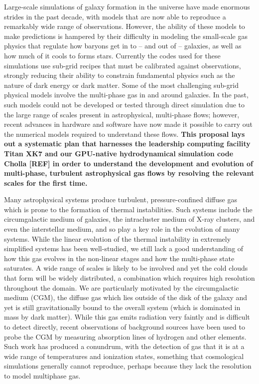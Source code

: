 \documentclass[11pt,letterpaper,english]{article}
\begin{document}
Large-scale simulations of galaxy formation in the universe have made enormous strides in the past decade, with models that are now able to reproduce a remarkably wide range of observations.  However, the ability of these models to make predictions is hampered by their difficulty in modeling the small-scale gas physics that regulate how baryons get in to -- and out of -- galaxies, as well as how much of it cools to forms stars.   Currently the codes used for these simulations use sub-grid recipes that must be calibrated against observations, strongly reducing their ability to constrain fundamental physics such as the nature of dark energy or dark matter.  Some of the most challenging sub-grid physical models involve the multi-phase gas in and around galaxies.   In the past, such models could not be developed or tested through direct simulation due to the large range of scales present in astrophysical, multi-phase flows; however, recent advances in hardware and software have now made it possible to carry out the numerical models required to understand these flows. {\bf This proposal lays out a systematic plan that harnesses the leadership computing facility Titan XK7 and our GPU-native hydrodynamical simulation code Cholla [REF] in order to understand the development and evolution of multi-phase, turbulent astrophysical gas flows by resolving the relevant scales for the first time. }

Many astrophysical systems produce turbulent, pressure-confined diffuse gas which is prone to the formation of thermal instabilities.  Such systems include the circumgalactic medium of galaxies, the intracluster medium of X-ray clusters, and even the interstellar medium, and so play a key role in the evolution of many systems.  While the linear evolution of the thermal instability in extremely simplified systems has been well-studied, we still lack a good understanding of how this gas evolves in the non-linear stages and how the multi-phase state saturates.  A wide range of scales is likely to be involved and yet the cold clouds that form will be widely distributed, a combination which requires high resolution throughout the domain.  We are particularly motivated by the circumgalactic medium (CGM), the diffuse gas which lies outside of the disk of the galaxy and yet is still gravitationally bound to the overall system (which is dominated in mass by dark matter).  While this gas emits radiation very faintly and is difficult to detect directly, recent observations of background sources have been used to probe the CGM by measuring absorption lines of hydrogen and other elements.  Such work has produced a conundrum, with the detection of gas that it is at a wide range of temperatures and ionization states, something that cosmological simulations generally cannot reproduce, perhaps because they lack the resolution to model multiphase gas.
\end{document}
